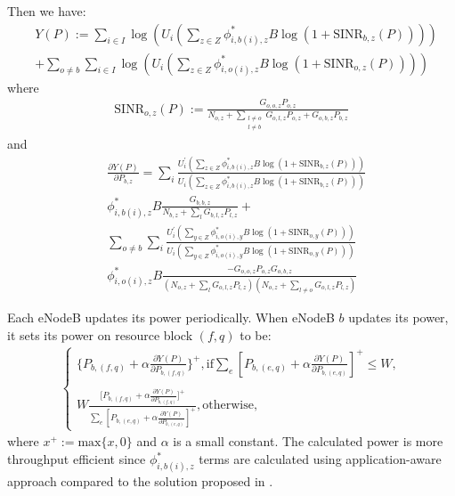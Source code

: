 \documentclass[journal]{IEEEtran} 				\IEEEoverridecommandlockouts 	\usepackage{amsmath,amssymb}
\begin{document}
Then we have:	
\begin{equation}\label{eqn:Y_P2}
\begin{aligned}
& Y(P) := \sum_{i \in I}\log(U_i(\sum_{z \in Z}\phi_{i,b(i),z}^*B\log(1+\text{SINR}_{b,z}(P))))
\\
& +\sum_{o \neq b}\sum_{i \in I}\log(U_i(\sum_{z \in Z}\phi_{i,o(i),z}^*B\log(1+\text{SINR}_{o,z}(P))))
\end{aligned}
\end{equation}
where 
\begin{equation*}\label{eqn:SINR2}
\begin{aligned}
\text{SINR}_{o,z}(P) := \frac{G_{o,o,z}P_{o,z}}{N_{o,z}+\sum_{\substack{l \neq o \\ l \neq b}} G_{o,l,z}P_{o,z}+G_{o,b,z}P_{b,z}}
\end{aligned}
\end{equation*}
and
\begin{equation}\label{eqn:deltaY}
\begin{aligned}
& \frac{\partial Y(P)}{\partial P_{b,z}}=\sum_i\frac{U_i^\prime(\sum_{z \in Z}\phi_{i,b(i),z}^* B \log(1+\text{SINR}_{b,z}(P)))}{U_i(\sum_{z \in Z}
\phi_{i,b(i),z}^* B \log(1+\text{SINR}_{b,z}(P)))} \\
& \phi_{i,b(i),z}^* B\frac{G_{b,b,z}}{N_{b,z}+\sum_lG_{b,l,z}P_{l,z}} + \\
& \sum_{o \neq b}\sum_i \frac{U_i^\prime(\sum_{y \in Z}\phi_{i,o(i),y}^*B\log(1+\text{SINR}_{o,y}(P)))}{U_i(\sum_{y \in Z}\phi_{i,o(i),y}^* B
\log(1+\text{SINR}_{o,y}(P)))} \\
& \phi_{i,o(i),z}^* B\frac{-G_{o,o,z}P_{o,z}G_{o,b,z}}{(N_{o,z}+\sum_l G_{o,l,z}P_{l,z})(N_{o,z}+\sum_{l \neq o}G_{o,l,z}P_{l,z})}
\end{aligned}
\end{equation}

Each eNodeB updates its power periodically. When eNodeB $b$ updates its power, it sets its power on resource block $(f,q)$ to be:
\begin{equation}\label{eqn:deltaY}
\begin{aligned}
\begin{cases}
    \big\{P_{b,(f,q)}+\alpha\frac{\partial Y(P)}{\partial P_{b,
(f,q)}}\big\}^+, \text{if} \sum_e[P_{b,(e,q)}+\alpha\frac{\partial Y(P)}{\partial P_{b,(e,q)}}]^+ \leq W, \\
\\
    W\frac{[P_{b,(f,q)}+\alpha\frac{\partial Y(P)}{\partial P_{b,
(f,q)}}\big]^+}{\sum_e[P_{b,(e,q)}+\alpha\frac{\partial Y(P)}{\partial P_{b,(e,q)}}]^+}, \text{otherwise},
  \end{cases}
\end{aligned}
\end{equation}
where $x^+ := \text{max}\{x,0\}$ and $\alpha$ is a small constant. The calculated power is more throughput efficient since $\phi_{i,b(i),z}^*$ terms are calculated using application-aware approach  compared to the solution proposed in \cite{SelfOrganizedLTE}.
\end{document}
